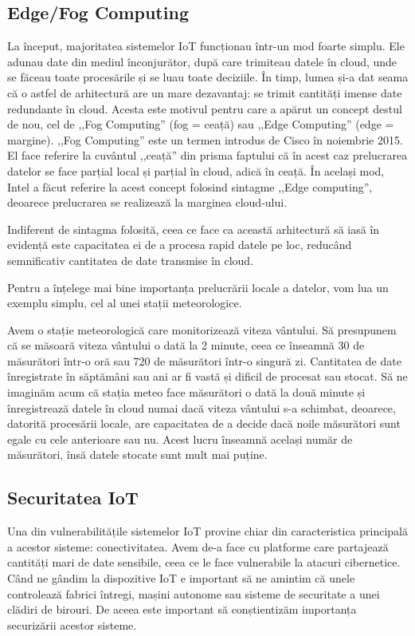 \subsection{Edge/Fog Computing}
\label{sec:embed-iot-edge}

La început, majoritatea sistemelor IoT funcționau într-un mod foarte simplu. Ele
adunau date din mediul înconjurător, după care trimiteau datele în cloud, unde
se făceau toate procesările și se luau toate deciziile. În timp, lumea și-a dat
seama că o astfel de arhitectură are un mare dezavantaj: se trimit cantități
imense date redundante în cloud. Acesta este motivul pentru care a apărut un
concept destul de nou, cel de ,,Fog Computing'' (fog = ceață) sau ,,Edge Computing''
(edge = margine). ,,Fog Computing'' este un termen introdus de Cisco în noiembrie
2015. El face referire la cuvântul ,,ceață'' din prisma faptului că în acest caz
prelucrarea datelor se face parțial local și parțial în cloud,
adică în ceață. În același mod, Intel a făcut referire la acest concept folosind
sintagme ,,Edge computing'', deoarece prelucrarea se realizează la marginea
cloud-ului.

Indiferent de sintagma folosită, ceea ce face ca această arhitectură să iasă în
evidență este capacitatea ei de a procesa rapid datele pe loc, reducând
semnificativ cantitatea de date transmise în cloud.

Pentru a înțelege mai bine importanța prelucrării locale a datelor, vom lua un
exemplu simplu, cel al unei stații meteorologice.

Avem o stație meteorologică care monitorizează viteza vântului. Să presupunem că
se măsoară viteza vântului o dată la 2 minute, ceea ce înseamnă 30 de măsurători
într-o oră sau 720 de măsurători într-o singură zi. Cantitatea de date
înregistrate în săptămâni sau ani ar fi vastă și dificil de procesat sau stocat.
Să ne imaginăm acum că stația meteo face măsurători o dată la două minute și
înregistrează datele în cloud numai dacă viteza vântului s-a schimbat, deoarece,
datorită procesării locale, are capacitatea de a decide dacă noile măsurători
sunt egale cu cele anterioare sau nu. Acest lucru înseamnă același număr de
măsurători, însă datele stocate sunt mult mai puține.

\subsection{Securitatea IoT}
\label{sec:embed:iot:security}

Una din vulnerabilitățile sistemelor IoT provine chiar din caracteristica
principală a acestor sisteme: conectivitatea. Avem de-a face cu platforme care
partajează cantități mari de date sensibile, ceea ce le face vulnerabile la
atacuri cibernetice. Când ne gândim la dispozitive IoT e important să ne amintim
că unele controlează fabrici întregi, mașini autonome sau sisteme de
securitate a unei clădiri de birouri. De aceea este important să conștientizăm
importanța securizării acestor sisteme.

